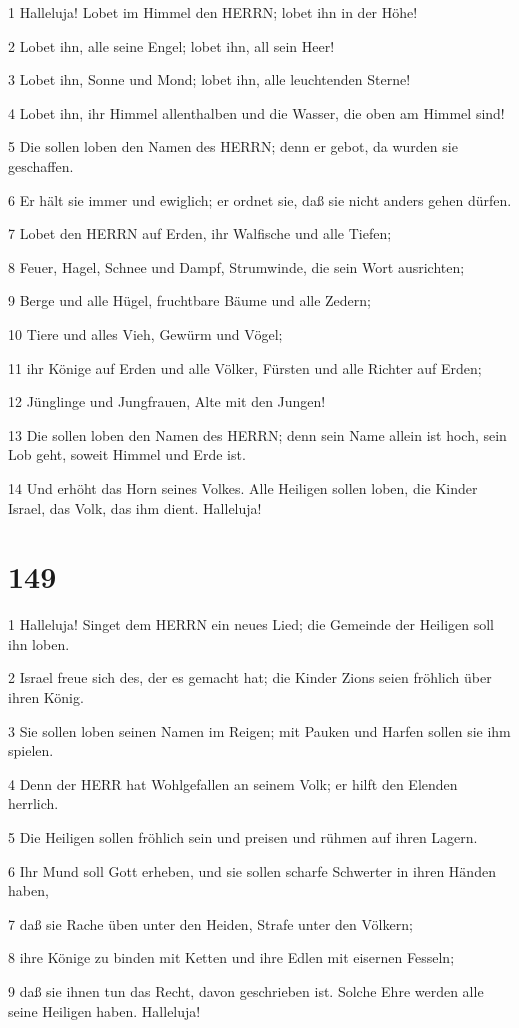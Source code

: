 \par 1 Halleluja! Lobet im Himmel den HERRN; lobet ihn in der Höhe!
\par 2 Lobet ihn, alle seine Engel; lobet ihn, all sein Heer!
\par 3 Lobet ihn, Sonne und Mond; lobet ihn, alle leuchtenden Sterne!
\par 4 Lobet ihn, ihr Himmel allenthalben und die Wasser, die oben am Himmel sind!
\par 5 Die sollen loben den Namen des HERRN; denn er gebot, da wurden sie geschaffen.
\par 6 Er hält sie immer und ewiglich; er ordnet sie, daß sie nicht anders gehen dürfen.
\par 7 Lobet den HERRN auf Erden, ihr Walfische und alle Tiefen;
\par 8 Feuer, Hagel, Schnee und Dampf, Strumwinde, die sein Wort ausrichten;
\par 9 Berge und alle Hügel, fruchtbare Bäume und alle Zedern;
\par 10 Tiere und alles Vieh, Gewürm und Vögel;
\par 11 ihr Könige auf Erden und alle Völker, Fürsten und alle Richter auf Erden;
\par 12 Jünglinge und Jungfrauen, Alte mit den Jungen!
\par 13 Die sollen loben den Namen des HERRN; denn sein Name allein ist hoch, sein Lob geht, soweit Himmel und Erde ist.
\par 14 Und erhöht das Horn seines Volkes. Alle Heiligen sollen loben, die Kinder Israel, das Volk, das ihm dient. Halleluja!

\chapter{149}

\par 1 Halleluja! Singet dem HERRN ein neues Lied; die Gemeinde der Heiligen soll ihn loben.
\par 2 Israel freue sich des, der es gemacht hat; die Kinder Zions seien fröhlich über ihren König.
\par 3 Sie sollen loben seinen Namen im Reigen; mit Pauken und Harfen sollen sie ihm spielen.
\par 4 Denn der HERR hat Wohlgefallen an seinem Volk; er hilft den Elenden herrlich.
\par 5 Die Heiligen sollen fröhlich sein und preisen und rühmen auf ihren Lagern.
\par 6 Ihr Mund soll Gott erheben, und sie sollen scharfe Schwerter in ihren Händen haben,
\par 7 daß sie Rache üben unter den Heiden, Strafe unter den Völkern;
\par 8 ihre Könige zu binden mit Ketten und ihre Edlen mit eisernen Fesseln;
\par 9 daß sie ihnen tun das Recht, davon geschrieben ist. Solche Ehre werden alle seine Heiligen haben. Halleluja!

